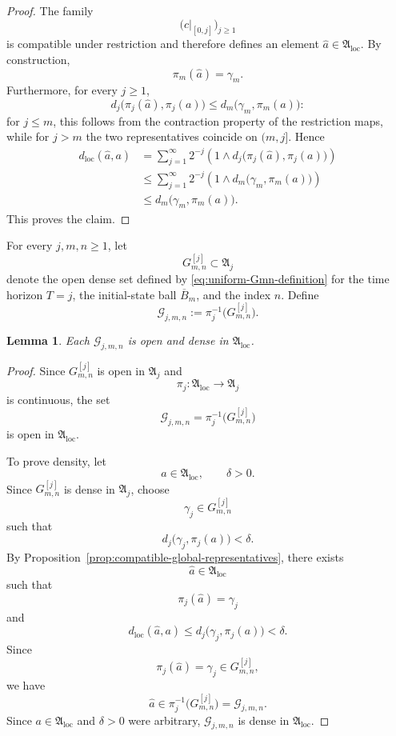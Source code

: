 \documentclass[12pt,oneside, reqno]{amsart}
\newtheorem{lemma}[theorem]{Lemma}
\numberwithin{equation}{section}
\begin{document}
\begin{proof}
	The family
	\[
	\bigl(c|_{[0,j]}\bigr)_{j\geq1}
	\]
	is compatible under restriction and therefore defines an element
	\(\widehat a\in\mathfrak A_{\mathrm{loc}}\). By construction,
	\[
	\pi_m(\widehat a)=\gamma_m.
	\]
	Furthermore, for every \(j\geq1\),
	\[
	d_j\bigl(\pi_j(\widehat a),\pi_j(a)\bigr)
	\leq
	d_m\bigl(\gamma_m,\pi_m(a)\bigr):
	\]
	for \(j\leq m\), this follows from the contraction property of the
	restriction maps, while for \(j>m\) the two representatives coincide
	on \((m,j]\). Hence
	\[
	\begin{aligned}
		d_{\mathrm{loc}}(\widehat a,a)
		&=
		\sum_{j=1}^{\infty}
		2^{-j}
		\left(
		1\wedge
		d_j\bigl(\pi_j(\widehat a),\pi_j(a)\bigr)
		\right)
		\\
		&\leq
		\sum_{j=1}^{\infty}
		2^{-j}
		\left(
		1\wedge
		d_m\bigl(\gamma_m,\pi_m(a)\bigr)
		\right)
		\\
		&\leq
		d_m\bigl(\gamma_m,\pi_m(a)\bigr).
	\end{aligned}
	\]
	This proves the claim.
\end{proof}
	
	For every $j,m,n\geq1$, let
	\[
	G_{m,n}^{[j]}\subset\mathfrak A_j
	\]
	denote the open dense set defined by
	\eqref{eq:uniform-Gmn-definition} for the time horizon $T=j$, the
	initial-state ball $\overline B_m$, and the  index $n$.
	Define
	\begin{equation}
		\label{eq:lifted-global-open-set}
		\mathcal G_{j,m,n}
		:=
		\pi_j^{-1}\bigl(G_{m,n}^{[j]}\bigr).
	\end{equation}
	
\begin{lemma}
	\label{lem:global-lifted-open-dense}
	Each \(\mathcal G_{j,m,n}\) is open and dense in
	\(\mathfrak A_{\mathrm{loc}}\).
\end{lemma}

\begin{proof}
	Since \(G_{m,n}^{[j]}\) is open in \(\mathfrak A_j\) and
	\[
	\pi_j:\mathfrak A_{\mathrm{loc}}\longrightarrow\mathfrak A_j
	\]
	is continuous, the set
	\[
	\mathcal G_{j,m,n}
	=
	\pi_j^{-1}\bigl(G_{m,n}^{[j]}\bigr)
	\]
	is open in \(\mathfrak A_{\mathrm{loc}}\).
	
	To prove density, let
	\[
	a\in\mathfrak A_{\mathrm{loc}},
	\qquad
	\delta>0.
	\]
	Since \(G_{m,n}^{[j]}\) is dense in \(\mathfrak A_j\), choose
	\[
	\gamma_j\in G_{m,n}^{[j]}
	\]
	such that
	\[
	d_j\bigl(\gamma_j,\pi_j(a)\bigr)<\delta.
	\]
	By Proposition~\ref{prop:compatible-global-representatives}, there exists
	\[
	\widehat a\in\mathfrak A_{\mathrm{loc}}
	\]
	such that
	\[
	\pi_j(\widehat a)=\gamma_j
	\]
	and
	\[
	d_{\mathrm{loc}}(\widehat a,a)
	\leq
	d_j\bigl(\gamma_j,\pi_j(a)\bigr)
	<
	\delta.
	\]
	Since
	\[
	\pi_j(\widehat a)
	=
	\gamma_j
	\in
	G_{m,n}^{[j]},
	\]
	we have
	\[
	\widehat a
	\in
	\pi_j^{-1}\bigl(G_{m,n}^{[j]}\bigr)
	=
	\mathcal G_{j,m,n}.
	\]
Since \(a\in\mathfrak A_{\mathrm{loc}}\) and \(\delta>0\) were arbitrary, \(\mathcal G_{j,m,n}\) is dense in \(\mathfrak A_{\mathrm{loc}}\).
\end{proof}
	
\end{document}
